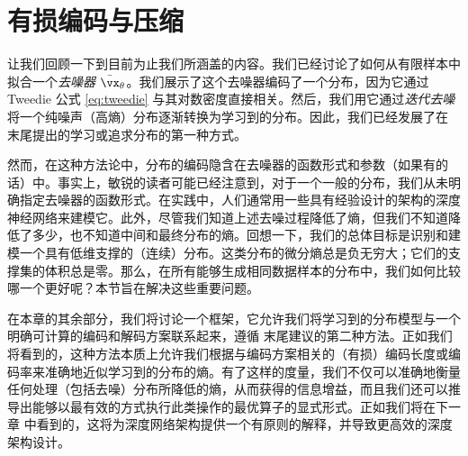 \documentclass[../../book-main.tex]{subfiles}
\begin{document}





\section{有损编码与压缩} \label{sec:lossy_compression}

让我们回顾一下到目前为止我们所涵盖的内容。我们已经讨论了如何从有限样本中拟合一个\textit{去噪器} \(\bar{\vx}_{\theta}\)。我们展示了这个去噪器编码了一个分布，因为它通过 Tweedie 公式 \eqref{eq:tweedie} 与其对数密度直接相关。然后，我们用它通过\textit{迭代去噪}将一个纯噪声（高熵）分布逐渐转换为学习到的分布。因此，我们已经发展了在  末尾提出的学习或追求分布的第一种方式。

然而，在这种方法论中，分布的编码隐含在去噪器的函数形式和参数（如果有的话）中。事实上，敏锐的读者可能已经注意到，对于一个一般的分布，我们从未明确指定去噪器的函数形式。在实践中，人们通常用一些具有经验设计的架构的深度神经网络来建模它。此外，尽管我们知道上述去噪过程降低了熵，但我们不知道降低了多少，也不知道中间和最终分布的熵。回想一下，我们的总体目标是识别和建模一个具有低维支撑的（连续）分布。这类分布的微分熵总是负无穷大；它们的支撑集的体积总是零。那么，在所有能够生成相同数据样本的分布中，我们如何比较哪一个更好呢？本节旨在解决这些重要问题。

在本章的其余部分，我们将讨论一个框架，它允许我们将学习到的分布模型与一个明确可计算的编码和解码方案联系起来，遵循  末尾建议的第二种方法。正如我们将看到的，这种方法本质上允许我们根据与编码方案相关的（有损）编码长度或编码率来准确地近似学习到的分布的熵。有了这样的度量，我们不仅可以准确地衡量任何处理（包括去噪）分布所降低的熵，从而获得的信息增益，而且我们还可以推导出能够以最有效的方式执行此类操作的最优算子的显式形式。正如我们将在下一章  中看到的，这将为深度网络架构提供一个有原则的解释，并导致更高效的深度架构设计。
\end{document}
